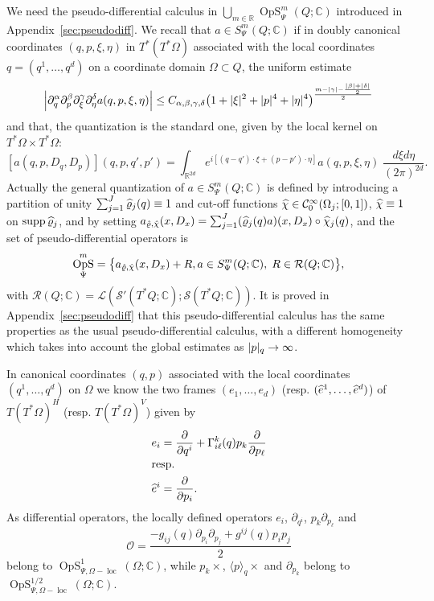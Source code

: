 \documentclass[AHL,Unicode,longabstracts]{cedram}
\newcommand{\C}{\mathbb{C}}
\newcommand{\R}{\mathbb{R}}
\newcommand{\clC}{\mathcal{C}}
\newcommand{\clO}{\mathcal{O}}
\newcommand{\clS}{\mathcal{S}}
\newcommand{\clL}{\mathcal{L}}
\newcommand{\clR}{\mathcal{R}}
\DeclareMathOperator{\OpS}{OpS}
\DeclareMathOperator{\suppp}{supp}
\DeclareMathOperator{\locc}{loc}
\let\oldhat\hat
\renewcommand*{\hat}[1]{\mathchoice{\widehat{#1}}{\widehat{#1}}{\oldhat{#1}}{\oldhat{#1}}}
\let\originalleft\left
\let\originalright\right
\renewcommand{\left}{\mathopen{}\mathclose\bgroup\originalleft}
\renewcommand{\right}{\aftergroup\egroup\originalright}
\renewcommand*{\to}{\mathchoice{\longrightarrow}{\rightarrow}{\rightarrow}{\rightarrow}}
\begin{document}
We need the pseudo-differential calculus in $\bigcup_{m\in \R}\OpS^{m}_{\Psi}(Q;\C)$ introduced in Appendix~\ref{sec:pseudodiff}. We recall that $a\in S^{m}_{\Psi}(Q;\C)$ if in doubly canonical coordinates $(q,p,\xi,\eta)$ in $T^{*}(T^{*}\Omega)$ associated with the local coordinates $q=(q^{1},\dots,q^{d})$ on a coordinate domain $\Omega\subset Q$, the uniform estimate
\[
\left|\partial_{q}^{\alpha}\partial_{p}^{\beta}\partial_{\xi}^{\gamma}\partial_{\eta}^{\delta}a(q,p,\xi,\eta)\right|\leq C_{\alpha,\beta,\gamma,\delta}\left(1+|\xi|^{2}+|p|^{4}+|\eta|^{4}\right)^{\frac{m-|\gamma|-\frac{|\beta|+|\delta|}{2}}{2}}
\]
and that, the quantization is the standard one, given by the local kernel on $T^{*}\Omega\times T^{*}\Omega$:
\[
[a(q,p,D_{q},D_{p})](q,p,q',p')=\int_{\R^{2d}}e^{i[(q-q')\cdot\xi+(p-p')\cdot\eta]}a(q,p,\xi,\eta)\;\frac{d\xi d\eta}{(2\pi)^{2d}}.
\]
Actually the general quantization of $a\in S^{m}_{\Psi}(Q;\C)$ is defined by introducing a partition of unity $\sum_{j=1}^{J}\hat{\varrho}_{j}(q)\equiv 1$ and cut-off functions $\hat\chi\in \clC^{\infty}_{0}(\Omega_{j};[0,1])$, $\hat\chi\equiv 1$ on $\suppp\hat{\varrho}_{j}$, and by setting $a_{\hat{\varrho},\hat{\chi}}(x,D_{x})=\sum_{j=1}^{J}(\hat{\varrho}_{j}(q)a)(x,D_{x})\circ \hat{\chi}_{j}(q)$, and the set of pseudo-differential operators is
\[
\OpS^{m}_{\Psi}=\bigl\{a_{\hat\varrho,\hat\chi}(x,D_{x})+R, a\in S^{m}_{\Psi}(Q;\C),\; R\in \clR(Q;\C)\bigr\},
\]
with $\clR(Q;\C)=\clL(\clS'(T^{*}Q;\C);\clS(T^{*}Q;\C)). $ It is proved in Appendix~\ref{sec:pseudodiff} that this pseudo-differential calculus has the same properties as the usual pseudo-differential calculus, with a different homogeneity which takes into account the global estimates as $|p|_q\to \infty$.

In canonical coordinates $(q,p)$ associated with the local coordinates $(q^{1},\dots,q^{d})$ on $\Omega$ we know the two frames $(e_{1},\dots,e_{d})$ (resp. $(\hat{e}^{1},\dots,\hat{e}^{d})$) of $T(T^{*}\Omega)^{H}$ (resp. $T(T^{*}\Omega)^{V}$) given by
\begin{align*}
e_{i}&=\frac{\partial}{\partial q^{i}}+\Gamma_{i\ell}^{k}(q)p_{k}\frac{\partial}{\partial p_{\ell}}\\
\intertext{resp.}
\hat{e}^{i}&=\frac{\partial}{\partial p_{i}}.
\end{align*}
As differential operators, the locally defined operators $e_{i}$, $\partial_{q^{i}}$, $p_{k}\partial_{p_{\ell}}$ and
\[
\clO=\frac{-g_{ij}(q)\partial_{p_{i}}\partial_{p_{j}}+g^{ij}(q)p_{i}p_{j}}{2}
\]
belong to $\OpS^{1}_{\Psi, \Omega-\locc}(\Omega;\C)$, while $p_{k}\times$, $\langle p\rangle_{q}\times$ and $\partial_{p_{k}}$ belong to $\OpS^{1/2}_{\Psi,\Omega-\locc}(\Omega;\C)$.
\end{document}
